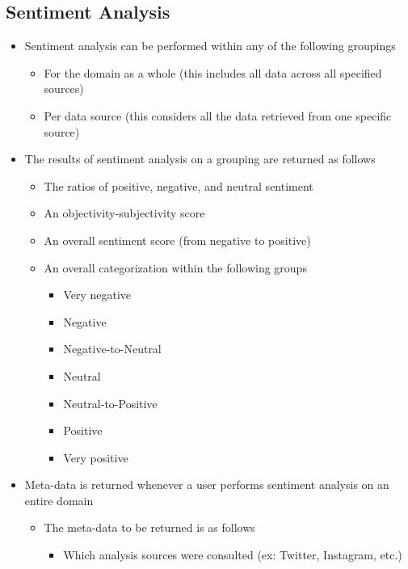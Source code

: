 \documentclass[12pt]{article}
\begin{document}
\subsection{Sentiment Analysis}
\begin{itemize}
  \item Sentiment analysis can be performed within any of the following groupings
        \begin{itemize}
          \item For the domain as a whole (this includes all data across all specified sources)
          \item Per data source (this considers all the data retrieved from one specific source)
        \end{itemize}
  \item The results of sentiment analysis on a grouping are returned as follows
        \begin{itemize}
          \item The ratios of positive, negative, and neutral sentiment
          \item An objectivity-subjectivity score
          \item An overall sentiment score (from negative to positive)
          \item An overall categorization within the following groups
                \begin{itemize}
                  \item Very negative
                  \item Negative
                  \item Negative-to-Neutral
                  \item Neutral
                  \item Neutral-to-Positive
                  \item Positive
                  \item Very positive
                \end{itemize}
        \end{itemize}
  \item Meta-data is returned whenever a user performs sentiment analysis on an entire domain
        \begin{itemize}
          \item The meta-data to be returned is as follows
                \begin{itemize}
                  \item Which analysis sources were consulted (ex: Twitter, Instagram, etc.)

\end{itemize}
\end{itemize}
\end{itemize}
\end{document}
